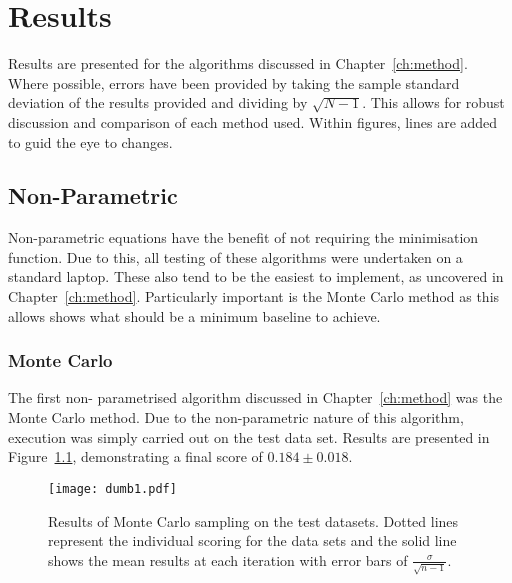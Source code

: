 \chapter{Results}










\graphicspath{{Chapter4/Figs/Vector/}{Chapter4/Figs/}}
Results are presented for the algorithms discussed in Chapter~\ref{ch:method}. Where possible, errors have been provided by taking the sample standard deviation of the results provided and dividing by $\sqrt{N-1}$. This allows for robust discussion and comparison of each method used. Within figures, lines are added to guid the eye to changes.

\section{Non-Parametric}
Non-parametric equations have the benefit of not requiring the minimisation function. Due to this, all testing of these algorithms were undertaken on a standard laptop. These also tend to be the easiest to implement, as uncovered in Chapter~\ref{ch:method}. Particularly important is the Monte Carlo method as this allows shows what should be a minimum baseline to achieve.

\subsection{Monte Carlo}
The first non- parametrised algorithm discussed in Chapter~\ref{ch:method} was the Monte Carlo method. Due to the non-parametric nature of this algorithm, execution was simply carried out on the test data set. Results are presented in Figure~\ref{fig:MCTestSet}, demonstrating a final score of ${0.184\pm{}0.018}$.

\begin{figure}[H]
    \begin{center}
        \texttt{[image: dumb1.pdf]}
        \caption[Monte Carlo]{Results of Monte Carlo sampling on the test datasets. Dotted lines represent the individual scoring for the data sets and the solid line shows the mean results at each iteration with error bars of $\frac{\sigma{}}{\sqrt{n-1}}$.}
        \label{fig:MCTestSet}
    \end{center}
\end{figure}

